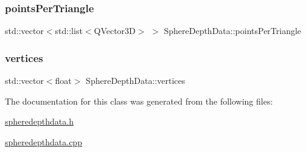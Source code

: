 \mbox{\label{class_sphere_depth_data_a9decfacc00300c153ecff80288b7413f}} 
\subsubsection{\texorpdfstring{points\+Per\+Triangle}{pointsPerTriangle}}
{\footnotesize\ttfamily std\+::vector$<$std\+::list$<$Q\+Vector3D$>$ $>$ Sphere\+Depth\+Data\+::points\+Per\+Triangle\hspace{0.3cm}{\ttfamily [private]}}

\mbox{\label{class_sphere_depth_data_a139a9131aa15308e012fc8190de2011d}} 
\subsubsection{\texorpdfstring{vertices}{vertices}}
{\footnotesize\ttfamily std\+::vector$<$float$>$ Sphere\+Depth\+Data\+::vertices\hspace{0.3cm}{\ttfamily [private]}}



The documentation for this class was generated from the following files\+:\begin{DoxyCompactItemize}
\item 
\hyperlink{spheredepthdata_8h}{spheredepthdata.\+h}\item 
\hyperlink{spheredepthdata_8cpp}{spheredepthdata.\+cpp}\end{DoxyCompactItemize}
